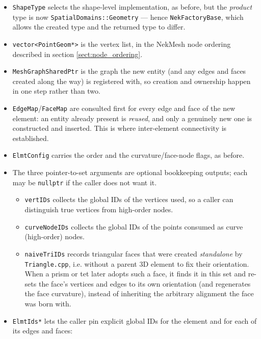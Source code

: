 \begin{itemize}
  \item \texttt{ShapeType} selects the shape-level implementation, as
    before, but the \textit{product} type is now
    \texttt{SpatialDomains::Geometry} --- hence
    \texttt{NekFactoryBase}, which allows the created type and the
    returned type to differ.
  \item \texttt{vector<PointGeom*>} is the vertex list, in the NekMesh
    node ordering described in section \ref{sect:node_ordering}.
  \item \texttt{MeshGraphSharedPtr} is the graph the new entity (and
    any edges and faces created along the way) is registered with, so
    creation and ownership happen in one step rather than two.
  \item \texttt{EdgeMap}/\texttt{FaceMap} are consulted first for
    every edge and face of the new element: an entity already present
    is \textit{reused}, and only a genuinely new one is constructed and
    inserted. This is where inter-element connectivity is established.
  \item \texttt{ElmtConfig} carries the order and the
    curvature/face-node flags, as before.
  \item The three pointer-to-set arguments are optional bookkeeping
    outputs; each may be \texttt{nullptr} if the caller does not want
    it.
    \begin{itemize}
      \item \texttt{vertIDs} collects the global IDs of the vertices
        used, so a caller can distinguish true vertices from
        high-order nodes.
      \item \texttt{curveNodeIDs} collects the global IDs of the
        points consumed as curve (high-order) nodes.
      \item \texttt{naiveTriIDs} records triangular faces that were
        created \textit{standalone} by \texttt{Triangle.cpp}, i.e.
        without a parent 3D element to fix their orientation. When a
        prism or tet later adopts such a face, it finds it in this set
        and re-sets the face's vertices and edges to its own
        orientation (and regenerates the face curvature), instead of
        inheriting the arbitrary alignment the face was born with.
    \end{itemize}
  \item \texttt{ElmtIds*} lets the caller pin explicit global IDs for
    the element and for each of its edges and faces:
\begin{lstlisting}[style=BashInputStyle]

\end{lstlisting}
\end{itemize}
